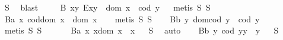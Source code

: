 \begin{isabellebody}
\isamarkupfalse%
\ S{}\ \isamarkupfalse%
\ blast%
\endisatagproof
{\isafoldproof}%
%
\isadelimproof
%
\endisadelimproof
\isanewline
\ \ \isamarkupfalse%
\ \ B{}{\isacharcolon}\ {\isachardoublequoteopen}\isactrlbold {\isasymforall}x{\isachardot}\isactrlbold {\isasymforall}y{\isachardot}\ E{\isacharparenleft}x{\isasymcdot}y{\isacharparenright}\ \isactrlbold {\isasymleftrightarrow}\ dom\ x\ {\isasymcong}\ cod\ y{\isachardoublequoteclose}%
\isadelimproof
\ %
\endisadelimproof
%
\isatagproof
{}\isamarkupfalse%
\ {\isacharparenleft}metis\ S{}\ S{}{\isacharparenright}%
\endisatagproof
{\isafoldproof}%
%
\isadelimproof
%
\endisadelimproof
\isanewline
\ \ \isamarkupfalse%
\ B{}a{\isacharcolon}\ {\isachardoublequoteopen}\isactrlbold {\isasymforall}x{\isachardot}\ cod{\isacharparenleft}dom\ x{\isacharparenright}\ {\isasymcong}\ dom\ x\ {\isachardoublequoteclose}%
\isadelimproof
\ %
\endisadelimproof
%
\isatagproof
{}\isamarkupfalse%
\ {\isacharparenleft}metis\ S{}\ S{}{\isacharparenright}%
\endisatagproof
{\isafoldproof}%
%
\isadelimproof
%
\endisadelimproof
\isanewline
\ \ \isamarkupfalse%
\ B{}b{\isacharcolon}\ {\isachardoublequoteopen}\isactrlbold {\isasymforall}y{\isachardot}\ dom{\isacharparenleft}cod\ y{\isacharparenright}\ {\isasymcong}\ cod\ y{\isachardoublequoteclose}%
\isadelimproof
\ %
\endisadelimproof
%
\isatagproof
{}\isamarkupfalse%
\ {\isacharparenleft}metis\ S{}\ S{}{\isacharparenright}%
\endisatagproof
{\isafoldproof}%
%
\isadelimproof
%
\endisadelimproof
\ \ \isanewline
\ \ \isamarkupfalse%
\ B{}a{\isacharcolon}\ {\isachardoublequoteopen}\isactrlbold {\isasymforall}x{\isachardot}\ x{\isasymcdot}{\isacharparenleft}dom\ x{\isacharparenright}\ {\isasymcong}\ x{\isachardoublequoteclose}%
\isadelimproof
\ %
\endisadelimproof
%
\isatagproof
{}\isamarkupfalse%
\ S{}\ \isamarkupfalse%
\ auto%
\endisatagproof
{\isafoldproof}%
%
\isadelimproof
%
\endisadelimproof
\isanewline
\ \ \isamarkupfalse%
\ B{}b{\isacharcolon}\ {\isachardoublequoteopen}\isactrlbold {\isasymforall}y{\isachardot}\ {\isacharparenleft}cod\ y{\isacharparenright}{\isasymcdot}y\ {\isasymcong}\ y{\isachardoublequoteclose}%
\isadelimproof
\ %
\endisadelimproof
%
\isatagproof
{}\isamarkupfalse%
\ S{}\ \isamarkupfalse%

\end{isabellebody}
